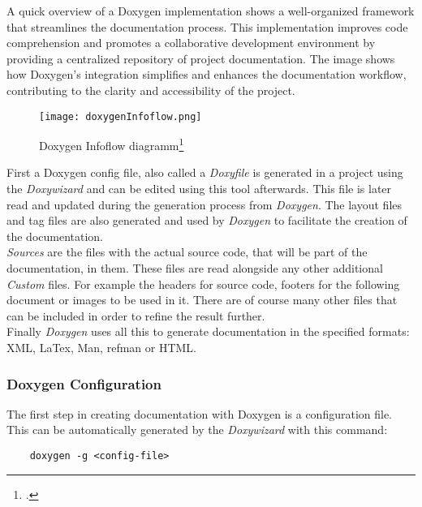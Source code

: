 A quick overview of a Doxygen implementation shows a well-organized framework that streamlines the documentation process. This implementation improves code 
comprehension and promotes a collaborative development environment by providing a centralized repository of project documentation. The image shows how Doxygen's 
integration simplifies and enhances the documentation workflow, contributing to the clarity and accessibility of the project.\\

\begin{figure}[h]
	\centering
	\texttt{[image: doxygenInfoflow.png]} 
	\caption{Doxygen Infoflow diagramm\footcite{doxygen_main_site}}
	\label{pic:doxygenInfoflow}
\end{figure}

First a Doxygen config file, also called a \textit{Doxyfile} is generated in a project using the \textit{Doxywizard} and can be edited using this tool afterwards. 
This file is later read and updated during the generation process from \textit{Doxygen}. The layout files and tag files are also generated and used by \textit{Doxygen}
to facilitate the creation of the documentation.\\
\vspace{\baselineskip}
\textit{Sources} are the files with the actual source code, that will be part of the documentation, in them. These files are read alongside any other additional \textit{Custom}
files. For example the headers for source code, footers for the following document or images to be used in it. There are of course many other files that can be included
in order to refine the result further.\\
\vspace{\baselineskip}
Finally \textit{Doxygen} uses all this to generate documentation in the specified formats: XML, LaTex, Man, refman or HTML. \\

\subsubsection{Doxygen Configuration}
The first step in creating documentation with Doxygen is a configuration file. This can be automatically generated by the \textit{Doxywizard} with this command:

\begin{verbatim}
    doxygen -g <config-file>
\end{verbatim}

